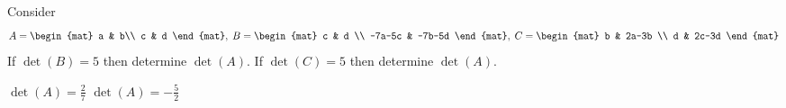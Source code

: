 
\begin{Exercise}[
name={},
title={}, 
difficulty=0,
origin={\cite{YL}}]
Consider
\[
A=
\begin{mat}
a & b\\
c & d 
\end{mat},\;
B=
\begin{mat}
c & d \\
-7a-5c & -7b-5d 
\end{mat},\;
C=
\begin{mat}
b & 2a-3b \\
d & 2c-3d
\end{mat}
\]
\Question If $\det(B)=5$ then determine $\det(A)$.
\Question If $\det(C)=5$ then determine $\det(A)$.

\end{Exercise}

\begin{Answer}
\begin{multicols}{2}
\Question $\det(A)=\frac{2}{7}$
\Question $\det(A)=-\frac{5}{2}$
\EndCurrentQuestion
\end{multicols}
\end{Answer}

